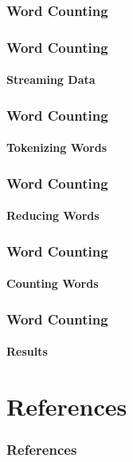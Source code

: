 \documentclass[english]{beamer}
\begin{document}
\begin{frame}
\frametitle{Word Counting}
\begin{figure}
\end{figure}
\end{frame}

\begin{frame}[fragile]
\frametitle{Word Counting}
\framesubtitle{Streaming Data}

\end{frame}

\begin{frame}[fragile]
\frametitle{Word Counting}
\framesubtitle{Tokenizing Words}

\end{frame}

\begin{frame}[fragile]
\frametitle{Word Counting}
\framesubtitle{Reducing Words}

\end{frame}

\begin{frame}[fragile]
\frametitle{Word Counting}
\framesubtitle{Counting Words}

\end{frame}

\begin{frame}[fragile]
\frametitle{Word Counting}
\framesubtitle{Results}

\end{frame}

\section*{References}
\begin{frame}[allowframebreaks]
\frametitle{References}
\nocite{*}
\renewcommand{\refname}{}


\end{frame}

\end{document}

